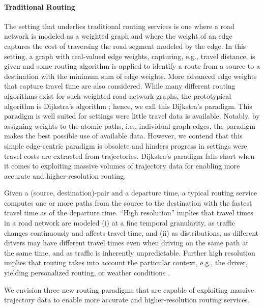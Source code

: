 \documentclass[11pt]{article}
\begin{document}
\paragraph{Traditional Routing} The setting that underlies traditional routing services is one where a road network is modeled as a weighted graph and where the weight of an edge captures the cost of traversing the road segment modeled by the edge. In this setting, a graph with real-valued edge weights, capturing, e.g., travel distance, is given and some routing algorithm is applied to identify a route from a source to a destination with the minimum sum of edge weights. More advanced edge weights that capture travel time are also considered. While many different routing algorithms exist for such weighted road-network graphs, the prototypical algorithm is Dijkstra's algorithm \cite{1}; hence, we call this Dijkstra's paradigm. This paradigm is well suited for settings were little travel data is available. Notably, by assigning weights to the atomic paths, i.e., individual graph edges, the paradigm makes the best possible use of available data. However, we contend that this simple edge-centric paradigm is obsolete and hinders progress in settings were travel costs are extracted from trajectories. Dijkstra's paradigm falls short when it comes to exploiting massive volumes of trajectory data for enabling more accurate and higher-resolution routing.

Given a (source, destination)-pair and a departure time, a typical routing service computes one or more paths from the source to the destination with the fastest travel time as of the departure time. ``High resolution'' implies that travel times in a road network are modeled (i) at a fine temporal granularity, as traffic changes continuously and affects travel time, and (ii) as distributions, as different drivers may have different travel times even when driving on the same path at the same time, and as traffic is inherently unpredictable. Further high resolution implies that routing takes into account the particular context, e.g., the driver, yielding personalized routing, or weather conditions \cite{2,3,4}.

We envision three new routing paradigms that are capable of exploiting massive trajectory data to enable more accurate and higher-resolution routing services.
\end{document}
